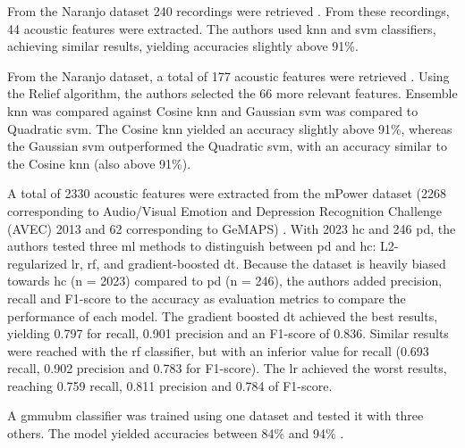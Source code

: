 From the Naranjo dataset \cite{naranjo_dataset} 240 recordings were retrieved \cite{parkinson_acoustic_yaman}. From these recordings, 44 acoustic features were extracted. The authors used \gls{knn} and \gls{svm} classifiers, achieving similar results, yielding accuracies slightly above 91\%.

From the Naranjo dataset, a total of 177 acoustic features were retrieved \cite{parkinson_acoustic_yaman}. Using the Relief algorithm, the authors selected the 66 more relevant features. Ensemble \gls{knn} was compared against Cosine \gls{knn} and Gaussian \gls{svm} was compared to Quadratic \gls{svm}. The Cosine \gls{knn} yielded an accuracy slightly above 91\%, whereas the Gaussian \gls{svm} outperformed the Quadratic \gls{svm}, with an accuracy similar to the Cosine \gls{knn} (also above 91\%).

A total of 2330 acoustic features were extracted from the mPower dataset \cite{mPower} (2268 corresponding to Audio/Visual Emotion and Depression Recognition Challenge (AVEC) 2013 and 62 corresponding to GeMAPS) \cite{parkinson_acoustic_tracy}. With 2023 \gls{hc} and 246 \gls{pd}, the authors tested three \gls{ml} methods to distinguish between \gls{pd} and \gls{hc}: L2-regularized \gls{lr}, \gls{rf}, and gradient-boosted \gls{dt}. Because the dataset is heavily biased towards \gls{hc} (n = 2023) compared to \gls{pd} (n = 246), the authors added precision, recall and F1-score to the accuracy as evaluation metrics to compare the performance of each model. The gradient boosted \gls{dt} achieved the best results, yielding 0.797 for recall, 0.901 precision and an F1-score of 0.836. Similar results were reached with the \gls{rf} classifier, but with an inferior value for recall (0.693 recall, 0.902 precision and 0.783 for F1-score). The \gls{lr} achieved the worst results, reaching 0.759 recall, 0.811 precision and 0.784 of F1-score.

A \gls{gmmubm} classifier was trained using one dataset and tested it with three others. The model yielded accuracies between 84\% and 94\% \cite{parkinson_phonemic_relevance}.

